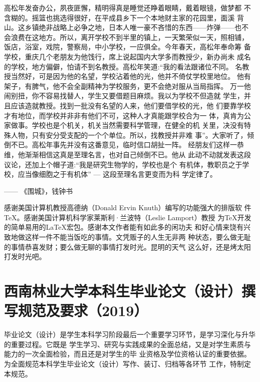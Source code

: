 \documentclass{swfuthesis}
\begin{document}
\begin{advisorInfo}
  高松年发奋办公，夙夜匪懈，精明得真是睡觉还睁着眼睛，戴着眼镜，做梦都
  不含糊的。摇篮也挑选得很好，在平成县乡下一个本地财主家的花园里，面溪
  背山。这乡镇绝非战略上必争之地，日本人唯一豪不吝惜的东西——炸弹——也不
  会浪费在这地方。所以，离开学校不到半里的镇上，一天繁荣似一天，照相铺，
  饭店，浴室，戏院，警察局，中小学校，一应俱全。今年春天，高松年奉命筹
  备学校，重庆几个老朋友为他饯行，席上说起国内大学多而教授少，新办尚未
  成名的学校，地方偏僻，怕请不到名教授。高松年笑道:“我的看法跟诸位不同。
  名教授当然好，可是因为他的名望，学校沾着他的光，他并不倚仗学校里地位。
  他有架子，有脾气，他不会全副精神为学校服务，更不会绝对服从当局指挥。
  万一他闹别扭，你不容易找替人，学生又要借题目麻烦。我以为学校不但造就
  学生，并且应该造就教授。找到一批没有名望的人来，他们要借学校的光，他
  们要靠学校才有地位，而学校并非非有他们不可，这种人才真能跟学校合为一
  体，真肯为公家做事。学校也是个机关，机关当然需要科学管理，在健全的机
  关里，决没有特殊人物，只有安分受支配的一个个单位。所以，找教授并非难
  事”。大家听了，倾倒不已。高松年事先并没有这番意见，临时信口胡扯一阵。
  经朋友们这样一恭维，他渐渐相信这真是至理名言，也对自己倾倒不已。他从
  此动不动就发表这段议论，还加上个帽子道:“我是研究生物学的，学校也是个
  有机体，教职员之于学校，应当像细胞之于有机体” --- 这段至理名言更变而为科
  学定律了。
  \begin{flushright}
    ------ 《围城》，钱钟书
  \end{flushright}
\end{advisorInfo}

\begin{acknowledgment} %
  感谢美国计算机教授高德纳（Donald Ervin Knuth）编写的功能强大的排版软
  件\TeX{}。感谢美国计算机科学家莱斯利·兰波特（Leslie Lamport）教授
  为\TeX{}开发的简单易用的\LaTeX{}宏包。感谢本文作者能有如此多的闲功夫
  和好心情来饶有兴致地做这样一件不能当饭吃的事情。文凭贩子的人生无非两
  种状态，要么做无耻的事情恭喜发财；要么做无聊的事情打发时光。昆明的天气
  这么好，还是烤太阳打发时光吧。
\end{acknowledgment}

\singlespacing

\chapter{西南林业大学本科生毕业论文（设计）撰写规范及要求（2019）}
\label{cha:std}

毕业论文（设计）是学生本科学习阶段最后一个重要学习环节，是学习深化与升华的重要过程。它既是
学生学习、研究与实践成果的全面总结，又是对学生素质与能力的一次全面检验，而且还是对学生的毕
业资格及学位资格认证的重要依据。为全面规范本科学生毕业论文（设计）写作、装订、归档等各环节
工作，特制定本规范。
\end{document}
